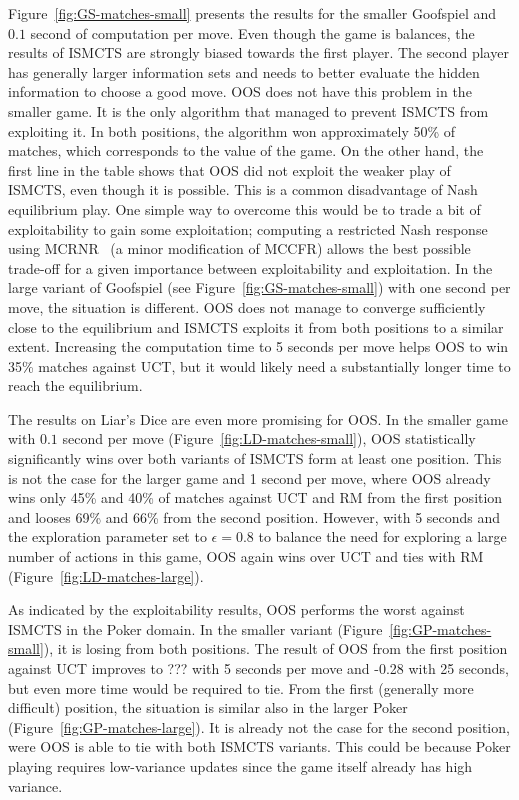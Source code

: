 \documentclass{aamas2015}
\begin{document}
Figure~\ref{fig:GS-matches-small} presents the results for the smaller Goofspiel and $0.1$ second of computation per move. Even though the game is balances, the results of ISMCTS are strongly biased towards the first player. The second player has generally larger information sets and needs to better evaluate the hidden information  to choose a good move. OOS does not have this problem in the smaller game. It is the only algorithm that managed to prevent ISMCTS from exploiting it.
In both positions, the algorithm won approximately 50\% of matches, which corresponds to the value of the game.
On the other hand, the first line in the table shows that OOS did not exploit the weaker play of ISMCTS, even though it is possible. This is a common disadvantage of Nash equilibrium play. %
One simple way to overcome this would be to trade a bit of exploitability to gain some exploitation; computing a restricted Nash response using  MCRNR~\cite{Ponsen11Computing} (a minor modification of MCCFR) allows the best possible trade-off for a given importance between exploitability and exploitation. 
In the large variant of Goofspiel (see Figure~\ref{fig:GS-matches-small}) with one second per move, the situation is different. OOS does not manage to converge sufficiently close to the equilibrium and ISMCTS exploits it from both positions to a similar extent. Increasing the computation time to 5 seconds per move helps OOS to win 35\% matches against UCT, but it would likely need a substantially longer time to reach the equilibrium.

The results on Liar's Dice are even more promising for OOS. In the smaller game with $0.1$ second per move (Figure~\ref{fig:LD-matches-small}), OOS statistically significantly wins over both variants of ISMCTS form at least one position. This is not the case for the larger game and 1 second per move, where OOS already wins only 45\% and 40\% of matches against UCT and RM from the first position and looses 69\% and 66\% from the second position. 
However, with 5 seconds and the exploration parameter set to $\epsilon=0.8$ to balance the need for exploring a large number of actions in this game, OOS again wins over UCT and ties with RM (Figure~\ref{fig:LD-matches-large}).

As indicated by the exploitability results, OOS performs the worst against ISMCTS in the Poker domain. In the smaller variant (Figure~\ref{fig:GP-matches-small}), it is losing from both positions. The result of OOS from the first position against UCT improves to ??? with 5 seconds per move and -0.28 with 25 seconds, but even more time would be required to tie. From the first (generally more difficult) position, the situation is similar also in the larger Poker (Figure~\ref{fig:GP-matches-large}). It is already not the case for the second position, were OOS is able to tie with both ISMCTS variants. 
This could be because Poker playing requires low-variance updates since the game itself already has high variance. 
\end{document}
